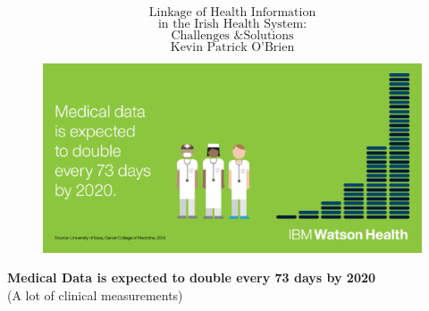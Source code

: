 \documentclass{beamer}
\begin{document}
	\begin{frame}
		\Huge
		\[\mbox{Linkage of Health Information} \] \[\mbox{in the Irish Health System:} \] \[\mbox{Challenges \& Solutions} \]
		\bigskip
		\Large
		\[\mbox{Kevin Patrick O'Brien} \]
	\end{frame}
\begin{frame}
	\begin{figure}
		\centering
		\includegraphics[width=0.99\linewidth]{medicaldata}
		
	\end{figure}
	\textbf{Medical Data is expected to double every 73 days by 2020}\\
	(A lot of clinical measurements)
	
\end{frame}	

		
\end{document}

